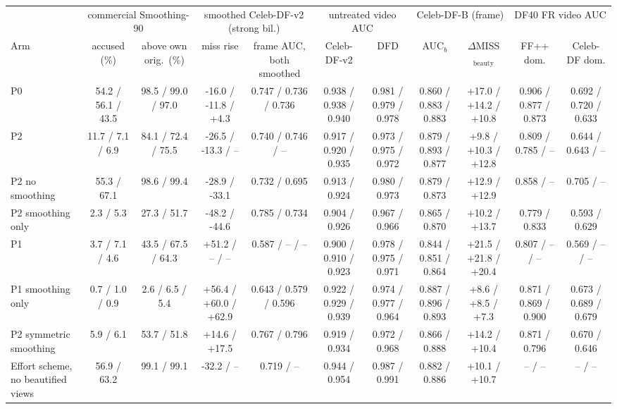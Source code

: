 \begin{tabular}{@{}l cc cc cc cc cc@{}}
\toprule
 & \multicolumn{2}{c}{commercial Smoothing-90} & \multicolumn{2}{c}{smoothed Celeb-DF-v2 (strong bil.)} & \multicolumn{2}{c}{untreated video AUC} & \multicolumn{2}{c}{Celeb-DF-B (frame)} & \multicolumn{2}{c}{DF40 FR video AUC} \\
\cmidrule(lr){2-3}\cmidrule(lr){4-5}\cmidrule(lr){6-7}\cmidrule(lr){8-9}\cmidrule(lr){10-11}
Arm & accused (\%) & above own orig.\ (\%) & miss rise & frame AUC, both smoothed & Celeb-DF-v2 & DFD & AUC$_b$ & $\Delta$MISS$_\text{beauty}$ & FF++ dom. & Celeb-DF dom. \\
\midrule
P0 & 54.2 / 56.1 / 43.5 & 98.5 / 99.0 / 97.0 & -16.0 / -11.8 / +4.3 & 0.747 / 0.736 / 0.736 & 0.938 / 0.938 / 0.940 & 0.981 / 0.979 / 0.978 & 0.860 / 0.883 / 0.883 & +17.0 / +14.2 / +10.8 & 0.906 / 0.877 / 0.873 & 0.692 / 0.720 / 0.633 \\
P2 & 11.7 / 7.1 / 6.9 & 84.1 / 72.4 / 75.5 & -26.5 / -13.3 / -- & 0.740 / 0.746 / -- & 0.917 / 0.920 / 0.935 & 0.973 / 0.975 / 0.972 & 0.879 / 0.893 / 0.877 & +9.8 / +10.3 / +12.8 & 0.809 / 0.785 / -- & 0.644 / 0.643 / -- \\
P2 no smoothing & 55.3 / 67.1 & 98.6 / 99.4 & -28.9 / -33.1 & 0.732 / 0.695 & 0.913 / 0.924 & 0.980 / 0.973 & 0.879 / 0.873 & +12.9 / +12.9 & 0.858 / -- & 0.705 / -- \\
P2 smoothing only & 2.3 / 5.3 & 27.3 / 51.7 & -48.2 / -44.6 & 0.785 / 0.734 & 0.904 / 0.926 & 0.967 / 0.966 & 0.865 / 0.870 & +10.2 / +13.7 & 0.779 / 0.833 & 0.593 / 0.629 \\
P1 & 3.7 / 7.1 / 4.6 & 43.5 / 67.5 / 64.3 & +51.2 / -- / -- & 0.587 / -- / -- & 0.900 / 0.910 / 0.923 & 0.978 / 0.975 / 0.971 & 0.844 / 0.851 / 0.864 & +21.5 / +21.8 / +20.4 & 0.807 / -- / -- & 0.569 / -- / -- \\
P1 smoothing only & 0.7 / 1.0 / 0.9 & 2.6 / 6.5 / 5.4 & +56.4 / +60.0 / +62.9 & 0.643 / 0.579 / 0.596 & 0.922 / 0.929 / 0.939 & 0.974 / 0.977 / 0.964 & 0.887 / 0.896 / 0.893 & +8.6 / +8.5 / +7.3 & 0.871 / 0.869 / 0.900 & 0.673 / 0.689 / 0.679 \\
P2 symmetric smoothing & 5.9 / 6.1 & 53.7 / 51.8 & +14.6 / +17.5 & 0.767 / 0.796 & 0.919 / 0.934 & 0.972 / 0.968 & 0.866 / 0.888 & +14.2 / +10.4 & 0.871 / 0.796 & 0.670 / 0.646 \\
Effort scheme, no beautified views & 56.9 / 63.2 & 99.1 / 99.1 & -32.2 / -- & 0.719 / -- & 0.944 / 0.954 & 0.987 / 0.991 & 0.882 / 0.886 & +10.1 / +10.7 & -- / -- & -- / -- \\

\end{tabular}
